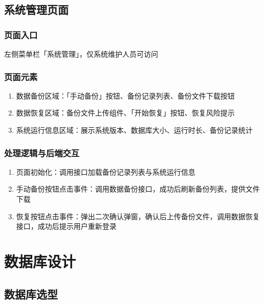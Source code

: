 \documentclass[12pt, a4paper]{article}
\begin{document}
\subsection{系统管理页面}

\subsubsection{页面入口}

左侧菜单栏「系统管理」，仅系统维护人员可访问

\subsubsection{页面元素}

\begin{enumerate}
\item  数据备份区域：「手动备份」按钮、备份记录列表、备份文件下载按钮

\item  数据恢复区域：备份文件上传组件、「开始恢复」按钮、恢复风险提示

\item  系统运行信息区域：展示系统版本、数据库大小、运行时长、备份记录统计
\end{enumerate}

\subsubsection{处理逻辑与后端交互}

\begin{enumerate}
\item  页面初始化：调用接口加载备份记录列表与系统运行信息

\item  手动备份按钮点击事件：调用数据备份接口，成功后刷新备份列表，提供文件下载

\item  恢复按钮点击事件：弹出二次确认弹窗，确认后上传备份文件，调用数据恢复接口，成功后提示用户重新登录
\end{enumerate}

\section{数据库设计}

\subsection{数据库选型}
\end{document}
